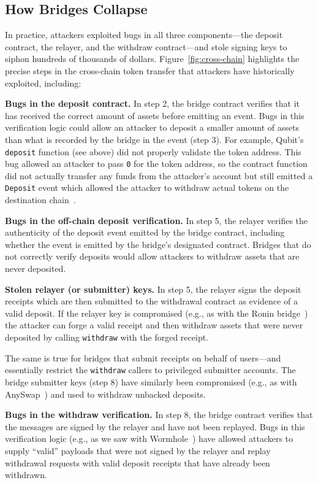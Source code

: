 \subsection{How Bridges Collapse}
In practice, attackers exploited bugs in all three components---the deposit
contract, the relayer, and the withdraw contract---and stole signing keys
to siphon hundreds of thousands of dollars.
%
Figure~\ref{fig:cross-chain} highlights the precise steps in the cross-chain
token transfer that attackers have historically exploited, including:
\begin{CompactItemize}
\item \textbf{Bugs in the deposit contract.} In step 2, the bridge contract
verifies that it has received the correct amount of assets before emitting an
event. Bugs in this verification logic could allow an attacker to deposit a
smaller amount of assets than what is recorded by the bridge in the event (step
3). For example, Qubit's \texttt{deposit} function  (see above) did not properly validate the token address. This bug allowed an attacker to pass \texttt{0} for the token address, so the contract function did not actually transfer any funds from the attacker's account but still emitted a \texttt{Deposit} event which allowed the attacker to withdraw actual tokens on the destination chain~\cite{qubit:rekt}.

\item \textbf{Bugs in the off-chain deposit verification.} In step 5, the
relayer verifies the authenticity of the deposit event emitted by the
bridge contract, including whether the event is emitted by the bridge's
designated contract.  Bridges that do not correctly verify
deposits would allow attackers to withdraw assets that are never deposited.

\item \textbf{Stolen relayer (or submitter) keys.} In step 5, the relayer signs the deposit receipts which are then submitted to the withdrawal
contract as evidence of a valid deposit. If the relayer key is compromised
(e.g., as with the Ronin bridge~\cite{roninattack}) the attacker can forge a
valid receipt and then withdraw assets that were never deposited by calling
\texttt{withdraw} with the forged receipt.

The same is true for bridges that submit receipts on behalf of users---and
essentially restrict the \texttt{withdraw} callers to privileged submitter
accounts. The bridge submitter keys (step 8) have similarly been compromised
(e.g., as with AnySwap~\cite{anyswapattack}) and used to withdraw
unbacked deposits.

\item \textbf{Bugs in the withdraw verification.} In step 8, the bridge contract
verifies that the messages are signed by the relayer and have not
been replayed. Bugs in this verification logic (e.g., as we saw with
Wormhole~\cite{wormholeattack}) have allowed attackers to supply ``valid''
payloads that were not signed by the relayer and replay withdrawal
requests with valid deposit receipts that have already been withdrawn.
\end{CompactItemize}


